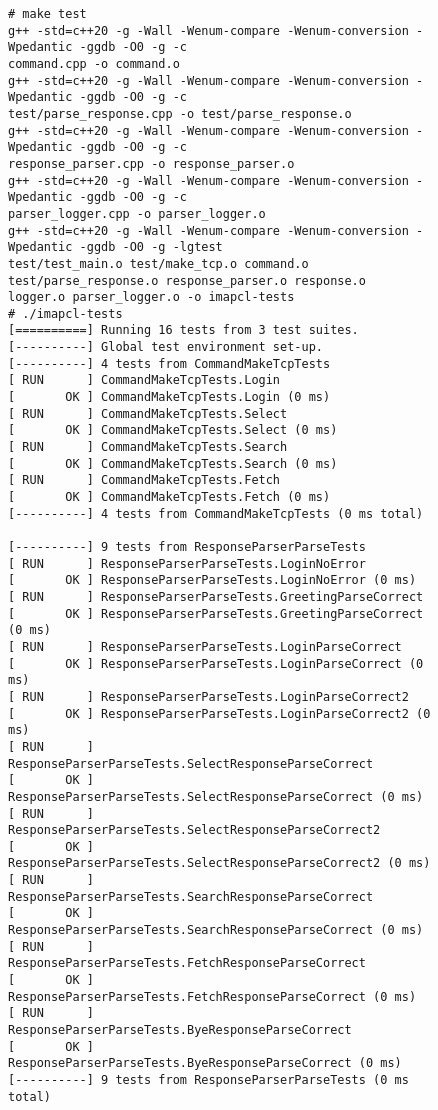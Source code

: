 \documentclass[a4]{report}
\begin{document}
\begin{figure}[h!]
\begin{verbatim}
# make test
g++ -std=c++20 -g -Wall -Wenum-compare -Wenum-conversion -Wpedantic -ggdb -O0 -g -c
command.cpp -o command.o
g++ -std=c++20 -g -Wall -Wenum-compare -Wenum-conversion -Wpedantic -ggdb -O0 -g -c
test/parse_response.cpp -o test/parse_response.o
g++ -std=c++20 -g -Wall -Wenum-compare -Wenum-conversion -Wpedantic -ggdb -O0 -g -c
response_parser.cpp -o response_parser.o
g++ -std=c++20 -g -Wall -Wenum-compare -Wenum-conversion -Wpedantic -ggdb -O0 -g -c
parser_logger.cpp -o parser_logger.o
g++ -std=c++20 -g -Wall -Wenum-compare -Wenum-conversion -Wpedantic -ggdb -O0 -g -lgtest
test/test_main.o test/make_tcp.o command.o test/parse_response.o response_parser.o response.o
logger.o parser_logger.o -o imapcl-tests
# ./imapcl-tests
[==========] Running 16 tests from 3 test suites.
[----------] Global test environment set-up.
[----------] 4 tests from CommandMakeTcpTests
[ RUN      ] CommandMakeTcpTests.Login
[       OK ] CommandMakeTcpTests.Login (0 ms)
[ RUN      ] CommandMakeTcpTests.Select
[       OK ] CommandMakeTcpTests.Select (0 ms)
[ RUN      ] CommandMakeTcpTests.Search
[       OK ] CommandMakeTcpTests.Search (0 ms)
[ RUN      ] CommandMakeTcpTests.Fetch
[       OK ] CommandMakeTcpTests.Fetch (0 ms)
[----------] 4 tests from CommandMakeTcpTests (0 ms total)

[----------] 9 tests from ResponseParserParseTests
[ RUN      ] ResponseParserParseTests.LoginNoError
[       OK ] ResponseParserParseTests.LoginNoError (0 ms)
[ RUN      ] ResponseParserParseTests.GreetingParseCorrect
[       OK ] ResponseParserParseTests.GreetingParseCorrect (0 ms)
[ RUN      ] ResponseParserParseTests.LoginParseCorrect
[       OK ] ResponseParserParseTests.LoginParseCorrect (0 ms)
[ RUN      ] ResponseParserParseTests.LoginParseCorrect2
[       OK ] ResponseParserParseTests.LoginParseCorrect2 (0 ms)
[ RUN      ] ResponseParserParseTests.SelectResponseParseCorrect
[       OK ] ResponseParserParseTests.SelectResponseParseCorrect (0 ms)
[ RUN      ] ResponseParserParseTests.SelectResponseParseCorrect2
[       OK ] ResponseParserParseTests.SelectResponseParseCorrect2 (0 ms)
[ RUN      ] ResponseParserParseTests.SearchResponseParseCorrect
[       OK ] ResponseParserParseTests.SearchResponseParseCorrect (0 ms)
[ RUN      ] ResponseParserParseTests.FetchResponseParseCorrect
[       OK ] ResponseParserParseTests.FetchResponseParseCorrect (0 ms)
[ RUN      ] ResponseParserParseTests.ByeResponseParseCorrect
[       OK ] ResponseParserParseTests.ByeResponseParseCorrect (0 ms)
[----------] 9 tests from ResponseParserParseTests (0 ms total)


\end{verbatim}
\end{figure}
\end{document}
